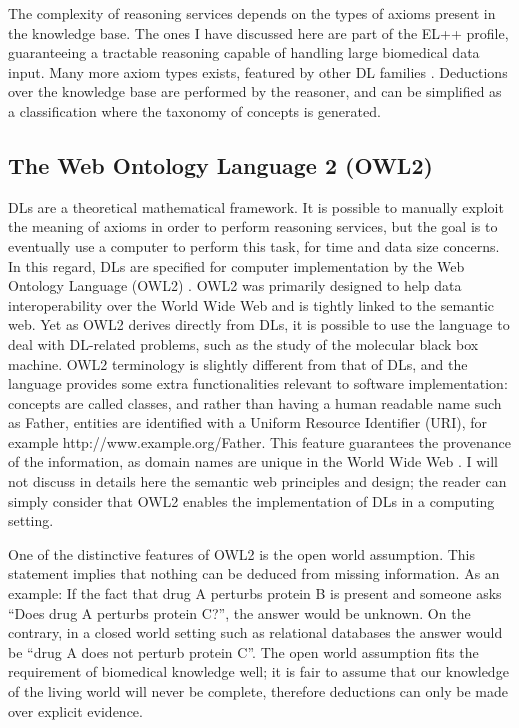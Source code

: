 The complexity of reasoning services depends on the types of axioms present in the knowledge base. The ones I have discussed here are part of the EL++ profile, guaranteeing a tractable reasoning capable of handling large biomedical data input. Many more axiom types exists, featured by other DL families \citep{krotzsch2012owl}. Deductions over the knowledge base are performed by the reasoner, and can be simplified as a classification where the taxonomy of concepts is generated. 

\subsection{The Web Ontology Language 2 (OWL2)}
DLs are a theoretical mathematical framework. It is possible to manually exploit the meaning of axioms in order to perform reasoning services, but the goal is to eventually use a computer to perform this task, for time and data size concerns. In this regard, DLs are specified for computer implementation by the Web Ontology Language (OWL2) \citep{owlw3c}. OWL2 was primarily designed to help data interoperability over the World Wide Web and is tightly linked to the semantic web. Yet as OWL2 derives directly from DLs, it is possible to use the language to deal with DL-related problems, such as the study of the molecular black box machine. OWL2 terminology is slightly different from that of DLs, and the language provides some extra functionalities relevant to software implementation: concepts are called classes, and rather than having a human readable name such as Father, entities are identified with a Uniform Resource Identifier (URI), for example http://www.example.org/Father. This feature guarantees the provenance of the information, as domain names are unique in the World Wide Web \citep{berners2001semantic}. I will not discuss in details here the semantic web principles and design; the reader can simply consider that OWL2 enables the implementation of DLs in a computing setting.

One of the distinctive features of OWL2 is the open world assumption. This statement implies that nothing can be deduced from missing information. As an example: If the fact that drug A perturbs protein B is present and someone asks “Does drug A perturbs protein C?”, the answer would be unknown. On the contrary, in a closed world setting such as relational databases the answer would be “drug A does not perturb protein C”. The open world assumption fits the requirement of biomedical knowledge well; it is fair to assume that our knowledge of the living world will never be complete, therefore deductions can only be made over explicit evidence.

